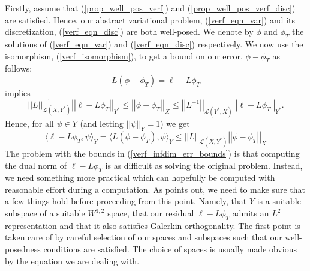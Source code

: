 \documentclass[12pt,a4paper]{article}
\theoremstyle{definition}
\begin{document}
Firstly, assume that (\ref{prop_well_pos_verf}) and (\ref{prop_well_pos_verf_disc}) are satisfied.  Hence, our abstract variational problem, (\ref{verf_eqn_var}) and its discretization, (\ref{verf_eqn_disc}) are both well-posed.   We denote by $\phi$ and $\phi_T$ the solutions of (\ref{verf_eqn_var}) and (\ref{verf_eqn_disc}) respectively. We now use the isomorphism,  (\ref{verf_isomorphism}), to get a bound on our error, $\phi-\phi_T$ as follows:
\begin{equation}
L\left(\phi-\phi_T\right)=\ell -L\phi_T
\end{equation}
implies
\begin{equation}\label{verf_infdim_err_bounds}
\left|\left|L\right|\right|^{-1}_{\mathcal{L}\left(X,Y^*\right)}\left|\left|\ell-L\phi_T\right|\right|_{Y^*}\leq \left|\left|\phi-\phi_T\right|\right|_X \leq \left|\left|L^{-1}\right|\right|_{\mathcal{L}\left(Y^*,X\right)}\left|\left|\ell-L\phi_T\right|\right|_{Y^*}.
\end{equation}
Hence, for all $\psi \in Y$ (and letting $\left|\left|\psi\right|\right|_Y=1$) we get 
\begin{equation}
\langle\ell -L\phi_T,\psi \rangle_Y=\langle L\left( \phi-\phi_T\right),\psi \rangle_Y\leq \left|\left|L\right|\right|_{\mathcal{L}\left(X,Y^*\right)}\left|\left|\phi-\phi_T\right|\right|_X
\end{equation}
The problem with the bounds in (\ref{verf_infdim_err_bounds}) is that computing the dual norm of $\ell-L\phi_T$ is as difficult as solving the original problem.  Instead, we need something more practical which can hopefully be computed with reasonable effort during a computation.   As \cite{verfurth2013posteriori} points out, we need to make sure that a few things hold before proceeding from this point. Namely, that $Y$ is a suitable subspace of a suitable $W^{1,2}$ space,
 that our residual $\ell - L\phi_T$ admits an $L^2$ representation and that it also satisfies Galerkin orthogonality.  The first point is taken care of by careful selection of our spaces and subspaces such that our well-posedness conditions are satisfied.  The choice of spaces is usually made obvious by the equation we are dealing with.  
 
\end{document}
